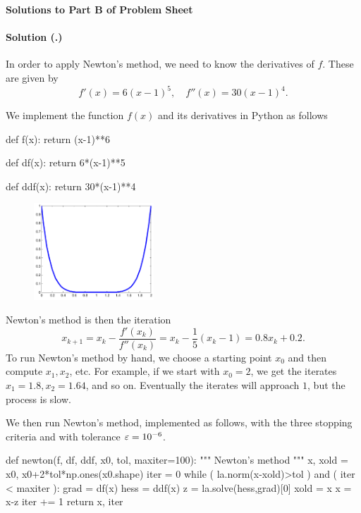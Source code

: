 \documentclass{article}
\newcounter{problemSheetNumber}
\newcounter{problems}
\renewcommand{\solution}[1]{\paragraph{Solution (\theproblemSheetNumber.\theproblems)}\addtocounter{problems}{1}\label{#1}}
\begin{document}
 
\begin{center}
{\Large {\bf Solutions to Part B of Problem Sheet \theproblemSheetNumber}}
\end{center}

\solution{pr:1} In order to apply Newton's method, we need to know the derivatives of $f$. These are given by
\begin{equation*}
  f'(x) = 6(x-1)^5, \quad f''(x) = 30(x-1)^4.
\end{equation*}

We implement the function $f(x)$ and its derivatives in Python as follows

\begin{ipythonnb}
def f(x):
    return (x-1)**6
    
def df(x):
    return 6*(x-1)**5
    
def ddf(x):
    return 30*(x-1)**4
\end{ipythonnb}

\begin{figure}[h!]
 \centering
 \includegraphics[width=0.4\textwidth]{images/flat_cropped.pdf}
\end{figure}

Newton's method is then the iteration
\begin{equation*}
  x_{k+1} = x_k - \frac{f'(x_k)}{f''(x_k)} = x_k - \frac{1}{5}(x_k-1) = 0.8x_k+0.2.
\end{equation*}
To run Newton's method by hand, we choose a starting point $x_0$ and then compute $x_1, x_2$, etc. For example, if we start with $x_0=2$, we get the iterates $x_1=1.8, x_2 = 1.64$, and so on. Eventually the iterates will approach $1$, but the process is slow.

We then run Newton's method, implemented as follows, with the three stopping criteria and with tolerance $\varepsilon=10^{-6}$. 

\begin{ipythonnb}
def newton(f, df, ddf, x0, tol, maxiter=100):
    """
    Newton's method
    """
    x, xold = x0, x0+2*tol*np.ones(x0.shape)
    iter = 0
    while ( la.norm(x-xold)>tol ) and ( iter < maxiter ):
        grad = df(x)
        hess = ddf(x)
        z = la.solve(hess,grad)[0]
        xold = x
        x = x-z
        iter += 1
    return x, iter	
\end{ipythonnb}
\end{document}
